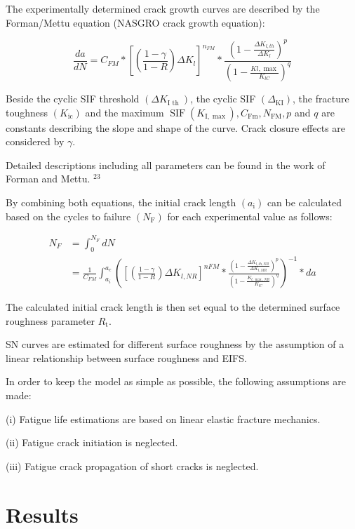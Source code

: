 \documentclass[10pt]{article}
\begin{document}
The experimentally determined crack growth curves are described by the Forman/Mettu equation (NASGRO crack growth equation):

$$
\frac{d a}{d N}=C_{F M} *\left[\left(\frac{1-\gamma}{1-R}\right) \Delta K_{l}\right]^{n_{F M}} * \frac{\left(1-\frac{\Delta K_{l, t h}}{\Delta K_{l}}\right)^{p}}{\left(1-\frac{K l, \max }{K_{l C}}\right)^{q}}
$$

Beside the cyclic SIF threshold $\left(\Delta K_{\mathrm{I} \text { th }}\right)$, the cyclic SIF $\left(\Delta_{\mathrm{KI}}\right)$, the fracture toughness $\left(K_{\mathrm{ic}}\right)$ and the maximum $\operatorname{SIF}\left(K_{\mathrm{I}, \max }\right), C_{\mathrm{Fm}}, N_{\mathrm{FM}}, p$ and $q$ are constants describing the slope and shape of the curve. Crack closure effects are considered by $\gamma$.

Detailed descriptions including all parameters can be found in the work of Forman and Mettu. ${ }^{23}$

By combining both equations, the initial crack length $\left(a_{\mathrm{i}}\right)$ can be calculated based on the cycles to failure $\left(N_{\mathrm{F}}\right)$ for each experimental value as follows:

$$
\begin{aligned}
N_{F} & =\int_{0}^{N_{F}} d N \\
& =\frac{1}{C_{F M}} \int_{a_{i}}^{a_{c}}\left(\left[\left(\frac{1-\gamma}{1-R}\right) \Delta K_{l, N R}\right]^{n F M} * \frac{\left(1-\frac{\Delta K_{l, t h, N R}}{\Delta K_{l, M R}}\right)^{p}}{\left(1-\frac{K_{l, \max , N R}}{K_{l C}}\right)^{q}}\right)^{-1} * d a
\end{aligned}
$$

The calculated initial crack length is then set equal to the determined surface roughness parameter $R_{\mathrm{t}}$.

SN curves are estimated for different surface roughness by the assumption of a linear relationship between surface roughness and EIFS.

In order to keep the model as simple as possible, the following assumptions are made:

(i) Fatigue life estimations are based on linear elastic fracture mechanics.

(ii) Fatigue crack initiation is neglected.

(iii) Fatigue crack propagation of short cracks is neglected.

\section*{Results}
\end{document}
